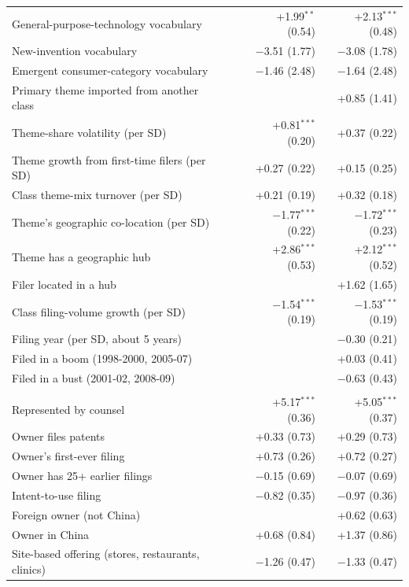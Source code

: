 \begin{small}
\begin{longtable}{>{\raggedright\arraybackslash}p{5.9cm}rrr}
\quad General-purpose-technology vocabulary & & +1.99$^{**}$ (0.54) & +2.13$^{***}$ (0.48) \\
\quad New-invention vocabulary & & $-$3.51 (1.77) & $-$3.08 (1.78) \\
\quad Emergent consumer-category vocabulary & & $-$1.46 (2.48) & $-$1.64 (2.48) \\
\quad Primary theme imported from another class & &  & +0.85 (1.41) \\
\quad Theme-share volatility (per SD) & & +0.81$^{***}$ (0.20) & +0.37 (0.22) \\
\quad Theme growth from first-time filers (per SD) & & +0.27 (0.22) & +0.15 (0.25) \\
\quad Class theme-mix turnover (per SD) & & +0.21 (0.19) & +0.32 (0.18) \\
\quad Theme's geographic co-location (per SD) & & $-$1.77$^{***}$ (0.22) & $-$1.72$^{***}$ (0.23) \\
\quad Theme has a geographic hub & & +2.86$^{***}$ (0.53) & +2.12$^{***}$ (0.52) \\
\quad Filer located in a hub & &  & +1.62 (1.65) \\
\quad Class filing-volume growth (per SD) & & $-$1.54$^{***}$ (0.19) & $-$1.53$^{***}$ (0.19) \\
\quad Filing year (per SD, about 5 years) & &  & $-$0.30 (0.21) \\
\quad Filed in a boom (1998-2000, 2005-07) & &  & +0.03 (0.41) \\
\quad Filed in a bust (2001-02, 2008-09) & &  & $-$0.63 (0.43) \\
\addlinespace\multicolumn{4}{l}{\textbf{C. Change in the value of lead (points)}} \\
\quad Represented by counsel & & +5.17$^{***}$ (0.36) & +5.05$^{***}$ (0.37) \\
\quad Owner files patents & & +0.33 (0.73) & +0.29 (0.73) \\
\quad Owner's first-ever filing & & +0.73 (0.26) & +0.72 (0.27) \\
\quad Owner has 25+ earlier filings & & $-$0.15 (0.69) & $-$0.07 (0.69) \\
\quad Intent-to-use filing & & $-$0.82 (0.35) & $-$0.97 (0.36) \\
\quad Foreign owner (not China) & &  & +0.62 (0.63) \\
\quad Owner in China & & +0.68 (0.84) & +1.37 (0.86) \\
\quad Site-based offering (stores, restaurants, clinics) & & $-$1.26 (0.47) & $-$1.33 (0.47) \\

\end{longtable}
\end{small}
